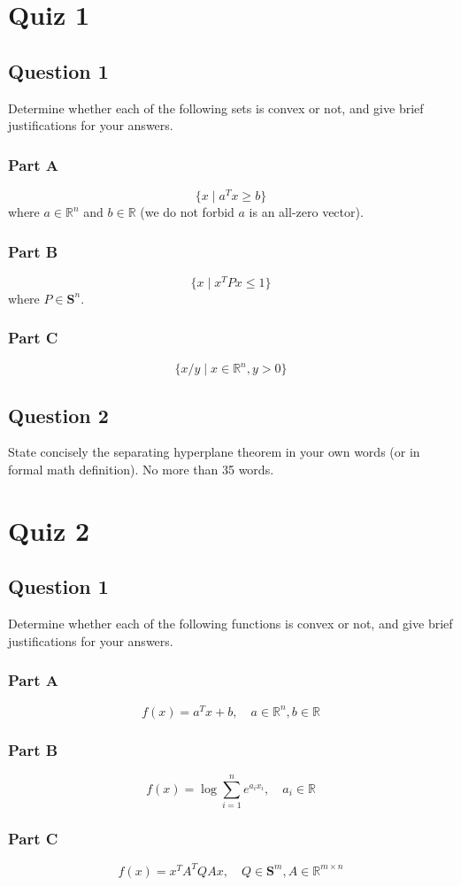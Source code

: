 \documentclass{article}
\begin{document}
\section{Quiz 1}
\subsection{Question 1}
Determine whether each of the following sets is convex or not, and give brief
justifications for your answers.
\subsubsection{Part A}
\[
    \{x \mid a^T x \geq b\}
\]
where $a \in \mathbb{R}^n$ and $b \in \mathbb{R}$ (we do not forbid $a$ is an all-zero vector).
\subsubsection{Part B}
\[
    \{x \mid x^T P x \leq 1\}
\]
where $P \in \mathbf{S}^n$.
\subsubsection{Part C}
\[
    \{x/y \mid x \in \mathbb{R}^n, y > 0\}
\]
\subsection{Question 2}
State concisely the separating hyperplane theorem in your own words (or in formal math definition). No more than 35 words.

\section{Quiz 2}
\subsection{Question 1}
Determine whether each of the following functions is convex or not, and give brief
justifications for your answers.
\subsubsection{Part A}
\[
    f(x) = a^T x + b, \quad a \in \mathbb{R}^n, b \in \mathbb{R}
\]
\subsubsection{Part B}
\[
    f(x) = \log \sum_{i=1}^n e^{a_i x_i}, \quad a_i \in \mathbb{R}
\]
\subsubsection{Part C}
\[
    f(x) = x^T A^T Q A x, \quad Q \in \mathbf{S}^m, A \in \mathbb{R}^{m \times n}
\]
\end{document}

